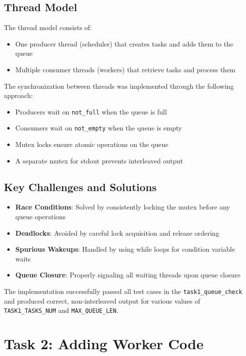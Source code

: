 \documentclass[11pt,a4paper]{article}
\begin{document}
\subsection{Thread Model}
The thread model consists of:
\begin{itemize}
    \item One producer thread (scheduler) that creates tasks and adds them to the queue
    \item Multiple consumer threads (workers) that retrieve tasks and process them
\end{itemize}

The synchronization between threads was implemented through the following approach:
\begin{itemize}
    \item Producers wait on \texttt{not\_full} when the queue is full
    \item Consumers wait on \texttt{not\_empty} when the queue is empty
    \item Mutex locks ensure atomic operations on the queue
    \item A separate mutex for stdout prevents interleaved output
\end{itemize}

\subsection{Key Challenges and Solutions}
\begin{itemize}
    \item \textbf{Race Conditions}: Solved by consistently locking the mutex before any queue operations
    \item \textbf{Deadlocks}: Avoided by careful lock acquisition and release ordering
    \item \textbf{Spurious Wakeups}: Handled by using while loops for condition variable waits
    \item \textbf{Queue Closure}: Properly signaling all waiting threads upon queue closure
\end{itemize}

The implementation successfully passed all test cases in the \texttt{task1\_queue\_check} and produced correct, non-interleaved output for various values of \texttt{TASK1\_TASKS\_NUM} and \texttt{MAX\_QUEUE\_LEN}.

\section{Task 2: Adding Worker Code}
\end{document}
